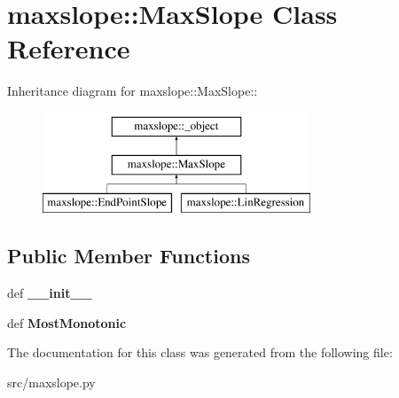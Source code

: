 \hypertarget{classmaxslope_1_1MaxSlope}{
\section{maxslope::MaxSlope Class Reference}
\label{d8/deb/classmaxslope_1_1MaxSlope}
}
Inheritance diagram for maxslope::MaxSlope::\begin{figure}[H]
\begin{center}
\leavevmode
\includegraphics[height=3cm]{d8/deb/classmaxslope_1_1MaxSlope}
\end{center}
\end{figure}
\subsection*{Public Member Functions}
\begin{DoxyCompactItemize}
\item 
\hypertarget{classmaxslope_1_1MaxSlope_a362903e9e198c5d097c7c09ae6f74dd8}{
def {\bfseries \_\-\_\-init\_\-\_\-}}
\label{d8/deb/classmaxslope_1_1MaxSlope_a362903e9e198c5d097c7c09ae6f74dd8}

\item 
\hypertarget{classmaxslope_1_1MaxSlope_a6fda530ba01a2b4bc78f7c1ad841cabf}{
def {\bfseries MostMonotonic}}
\label{d8/deb/classmaxslope_1_1MaxSlope_a6fda530ba01a2b4bc78f7c1ad841cabf}

\end{DoxyCompactItemize}


The documentation for this class was generated from the following file:\begin{DoxyCompactItemize}
\item 
src/maxslope.py\end{DoxyCompactItemize}
